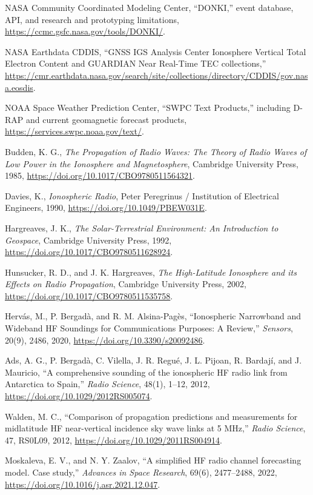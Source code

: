\documentclass[11pt,a4paper]{article}
\begin{document}
\begin{enumerate}[label={[\arabic*]}]
  \item NASA Community Coordinated Modeling Center, “DONKI,” event database, API, and research and prototyping limitations, \url{https://ccmc.gsfc.nasa.gov/tools/DONKI/}.
  \item NASA Earthdata CDDIS, “GNSS IGS Analysis Center Ionosphere Vertical Total Electron Content and GUARDIAN Near Real-Time TEC collections,” \url{https://cmr.earthdata.nasa.gov/search/site/collections/directory/CDDIS/gov.nasa.eosdis}.
  \item NOAA Space Weather Prediction Center, “SWPC Text Products,” including D-RAP and current geomagnetic forecast products, \url{https://services.swpc.noaa.gov/text/}.
  \item Budden, K. G., \emph{The Propagation of Radio Waves: The Theory of Radio Waves of Low Power in the Ionosphere and Magnetosphere}, Cambridge University Press, 1985, \url{https://doi.org/10.1017/CBO9780511564321}.
  \item Davies, K., \emph{Ionospheric Radio}, Peter Peregrinus / Institution of Electrical Engineers, 1990, \url{https://doi.org/10.1049/PBEW031E}.
  \item Hargreaves, J. K., \emph{The Solar-Terrestrial Environment: An Introduction to Geospace}, Cambridge University Press, 1992, \url{https://doi.org/10.1017/CBO9780511628924}.
  \item Hunsucker, R. D., and J. K. Hargreaves, \emph{The High-Latitude Ionosphere and its Effects on Radio Propagation}, Cambridge University Press, 2002, \url{https://doi.org/10.1017/CBO9780511535758}.
  \item Herv\'as, M., P. Bergad\`a, and R. M. Alsina-Pag\`es, “Ionospheric Narrowband and Wideband HF Soundings for Communications Purposes: A Review,” \emph{Sensors}, 20(9), 2486, 2020, \url{https://doi.org/10.3390/s20092486}.
  \item Ads, A. G., P. Bergad\`a, C. Vilella, J. R. Regu\'e, J. L. Pijoan, R. Bardaj\'i, and J. Mauricio, “A comprehensive sounding of the ionospheric HF radio link from Antarctica to Spain,” \emph{Radio Science}, 48(1), 1--12, 2012, \url{https://doi.org/10.1029/2012RS005074}.
  \item Walden, M. C., “Comparison of propagation predictions and measurements for midlatitude HF near-vertical incidence sky wave links at 5 MHz,” \emph{Radio Science}, 47, RS0L09, 2012, \url{https://doi.org/10.1029/2011RS004914}.
  \item Moskaleva, E. V., and N. Y. Zaalov, “A simplified HF radio channel forecasting model. Case study,” \emph{Advances in Space Research}, 69(6), 2477--2488, 2022, \url{https://doi.org/10.1016/j.asr.2021.12.047}.

\end{enumerate}
\end{document}
